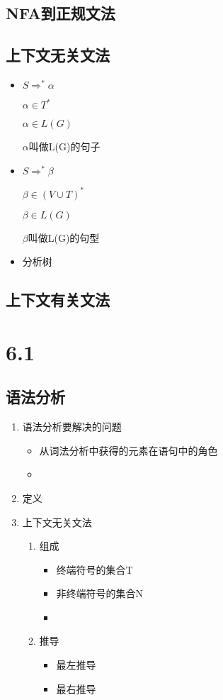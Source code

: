 \documentclass[UTF8]{article}
\begin{document}
\subsection{NFA到正规文法}
\subsection{上下文无关文法}
\begin{itemize}
	\item $ S\Rightarrow^*\alpha $
	
	$\alpha\in T^*  $
	
	$\alpha\in L(G) $
	
	$\alpha$叫做L(G)的句子
	\item $ S\Rightarrow^*\beta $
	
	$\beta\in (V\cup T)^*  $
	
	$\beta\in L(G) $
	
	$\beta$叫做L(G)的句型
	\item 分析树
\end{itemize}

\subsection{上下文有关文法}






\section*{6.1}
\subsection*{语法分析}
\begin{enumerate}
	\item 语法分析要解决的问题
	\begin{itemize}
		\item 从词法分析中获得的元素在语句中的角色
		\item 
	\end{itemize}
	\item 定义
	\item 上下文无关文法
	\begin{enumerate}
		\item 组成
		\begin{itemize}
			\item 终端符号的集合T
			\item 非终端符号的集合N
			\item 
		\end{itemize}
		\item 推导
		\begin{itemize}
			\item 最左推导
			\item 最右推导
		\end{itemize}
	\end{enumerate}
	

\end{enumerate}
\end{document}
